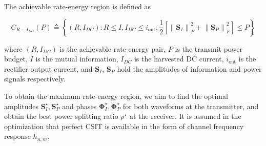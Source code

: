 The achievable rate-energy region is defined as

\begin{equation}\label{eqn:rate-energy-region}
  {C_{R - {I_{DC}}}}(P) \triangleq \left\{ {\left( {R,{I_{DC}}} \right):R \leqslant I,{I_{DC}} \leqslant {i_{{\text{out}}}},\frac{1}{2}\left[ {\left\| {{{\mathbf{S}}_I}} \right\|_F^2 + \left\| {{{\mathbf{S}}_P}} \right\|_F^2} \right] \leqslant P} \right\}
\end{equation}

where ${\left( {R,{I_{DC}}} \right)}$ is the achievable rate-energy pair, $P$ is the transmit power budget, $I$ is the mutual information, ${{I_{DC}}}$ is the harvested DC current, ${{i_{{\text{out}}}}}$ is the rectifier output current, and ${{{\mathbf{S}}_I}}$, ${{{\mathbf{S}}_P}}$ hold the amplitudes of information and power signals respectively.

To obtain the maximum rate-energy region, we aim to find the optimal amplitudes ${\mathbf{S}}_I^ \star ,{\mathbf{S}}_P^ \star $ and phases ${\mathbf{\Phi }}_I^ \star ,{\mathbf{\Phi }}_P^ \star $ for both waveforms at the transmitter, and obtain the best power splitting ratio ${\rho ^ \star }$ at the receiver. It is assumed in the optimization that perfect CSIT is available in the form of channel frequency response ${h_{n,m}}$.

